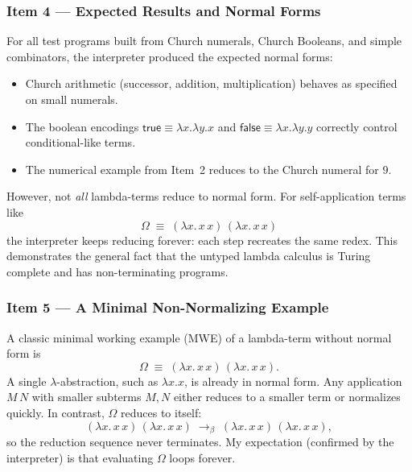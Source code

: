 \documentclass{article}
\theoremstyle{theorem}
\theoremstyle{definition}
\theoremstyle{remark}
\begin{document}
\subsubsection*{Item 4 --- Expected Results and Normal Forms}
For all test programs built from Church numerals, Church Booleans, and simple combinators, the interpreter produced the expected normal forms:
\begin{itemize}
  \item Church arithmetic (successor, addition, multiplication) behaves as specified on small numerals.
  \item The boolean encodings \(\mathsf{true} \equiv \lambda x.\lambda y.x\) and \(\mathsf{false} \equiv \lambda x.\lambda y.y\) correctly control conditional-like terms.
  \item The numerical example from Item~2 reduces to the Church numeral for \(9\).
\end{itemize}
However, not \emph{all} lambda-terms reduce to normal form. For self-application terms like
\[
\Omega \;\equiv\; (\lambda x.\, x\,x)\,(\lambda x.\, x\,x)
\]
the interpreter keeps reducing forever: each step recreates the same redex. This demonstrates the general fact that the untyped lambda calculus is Turing complete and has non-terminating programs.

\subsubsection*{Item 5 --- A Minimal Non-Normalizing Example}
A classic minimal working example (MWE) of a lambda-term without normal form is
\[
\Omega \;\equiv\; (\lambda x.\, x\,x)\,(\lambda x.\, x\,x).
\]
A single \(\lambda\)-abstraction, such as \(\lambda x.x\), is already in normal form. Any application \(M\,N\) with smaller subterms \(M,N\) either reduces to a smaller term or normalizes quickly. In contrast, \(\Omega\) reduces to itself:
\[
(\lambda x.\, x\,x)\,(\lambda x.\, x\,x) \;\to_\beta\;
(\lambda x.\, x\,x)\,(\lambda x.\, x\,x),
\]
so the reduction sequence never terminates. My expectation (confirmed by the interpreter) is that evaluating \(\Omega\) loops forever.
\end{document}
